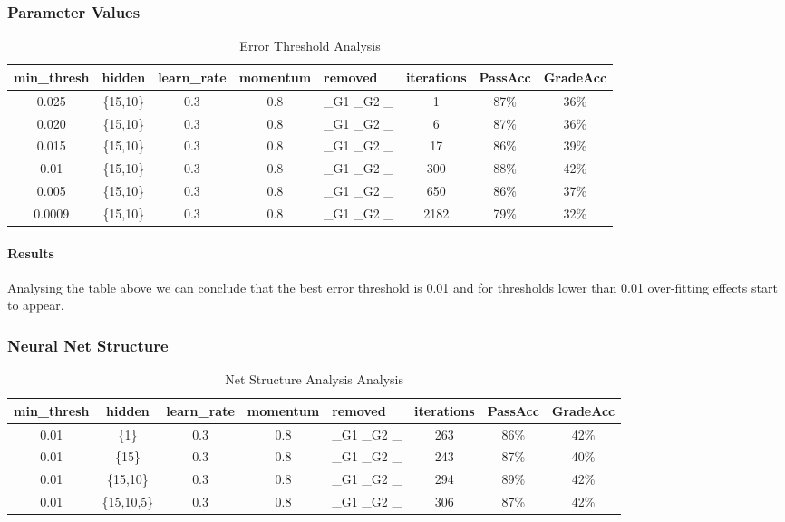 \documentclass[11pt]{article}
\begin{document}
\subsubsection{Parameter Values}
\begin{table}[h]

\begin{tabular}{| c | c | c | c | p{3cm} | c | c | c |}
\hline \textbf{min\_thresh} & \textbf{hidden} & \textbf{learn\_rate} & \textbf{momentum} & \textbf{removed} & \textbf{iterations} & \textbf{PassAcc} & \textbf{GradeAcc}\\
\hline 0.025 & \{15,10\} & 0.3 & 0.8 & \_G1 \_G2 \_ & 1 & 87\% & 36\%\\
\hline 0.020 & \{15,10\} & 0.3 & 0.8 & \_G1 \_G2 \_ & 6 & 87\% & 36\%\\
\hline 0.015 & \{15,10\} & 0.3 & 0.8 & \_G1 \_G2 \_ & 17 & 86\% & 39\%\\
\hline 0.01 & \{15,10\} & 0.3 & 0.8 & \_G1 \_G2 \_ & 300 & 88\% & 42\%\\
\hline 0.005 & \{15,10\} & 0.3 & 0.8 & \_G1 \_G2 \_ & 650 & 86\% & 37\%\\
\hline 0.0009 & \{15,10\} & 0.3 & 0.8 & \_G1 \_G2 \_ & 2182 & 79\% & 32\%\\
\hline
\end{tabular}
\caption{Error Threshold Analysis}
\end{table}

\paragraph{Results}
Analysing the table above we can conclude that the best error threshold is 0.01 and for thresholds lower than 0.01 over-fitting effects start to appear.
\subsubsection{Neural Net Structure}
\begin{table}[h]
\begin{tabular}{| c | c | c | c | p{3cm} | c | c | c |}
\hline \textbf{min\_thresh} & \textbf{hidden} & \textbf{learn\_rate} & \textbf{momentum} & \textbf{removed} & \textbf{iterations} & \textbf{PassAcc} & \textbf{GradeAcc}\\
\hline 0.01 & \{1\} & 0.3 & 0.8 & \_G1 \_G2 \_ & 263 & 86\% & 42\%\\
\hline 0.01 & \{15\} & 0.3 & 0.8 & \_G1 \_G2 \_ & 243 & 87\% & 40\%\\
\hline 0.01 & \{15,10\} & 0.3 & 0.8 & \_G1 \_G2 \_ & 294 & 89\% & 42\%\\
\hline 0.01 & \{15,10,5\} & 0.3 & 0.8 & \_G1 \_G2 \_ & 306 & 87\% & 42\%\\
\hline
\end{tabular}
\caption{Net Structure Analysis Analysis}
\end{table}
\end{document}
